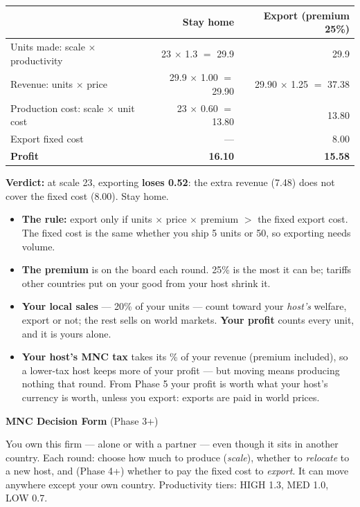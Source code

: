 \documentclass[11pt]{article}
\begin{document}
\vspace{6pt}
\begin{center}
\renewcommand{\arraystretch}{1.25}
\begin{tabular}{lrr}
\toprule
 & \textbf{Stay home} & \textbf{Export} (premium 25\%) \\
\midrule
Units made: scale $\times$ productivity & 23 $\times$ 1.3 $=$ 29.9 & 29.9 \\
Revenue: units $\times$ price & 29.9 $\times$ 1.00 $=$ 29.90
  & 29.90 $\times$ 1.25 $=$ 37.38 \\
Production cost: scale $\times$ unit cost & 23 $\times$ 0.60 $=$ 13.80 & 13.80 \\
Export fixed cost & --- & 8.00 \\
\midrule
\textbf{Profit} & \textbf{16.10} & \textbf{15.58} \\
\bottomrule
\end{tabular}
\end{center}

\textbf{Verdict:} at scale 23, exporting \textbf{loses 0.52}: the extra revenue (7.48) does not cover the fixed cost (8.00). Stay home.

\vspace{4pt}
\begin{itemize}[nosep,leftmargin=1.2em]
  \item \textbf{The rule:} export only if units $\times$ price $\times$ premium
    $>$ the fixed export cost. The fixed cost is the same whether you ship 5 units
    or 50, so exporting needs volume.
  \item \textbf{The premium} is on the board each round. 25\% is the most it
    can be; tariffs other countries put on your good from your host shrink it.
  \item \textbf{Your local sales} --- 20\% of your units --- count toward your
    \emph{host's} welfare, export or not; the rest sells on world markets.
    \textbf{Your profit} counts every unit, and it is yours alone.
  \item \textbf{Your host's MNC tax} takes its \% of your revenue (premium
    included), so a lower-tax host keeps more of your profit --- but moving
    means producing nothing that round. From Phase 5 your profit is worth what
    your host's currency is worth, unless you export: exports are paid in world
    prices.
\end{itemize}

\newpage
{\large\bfseries MNC Decision Form} \hfill (Phase 3+)\par
You own this firm --- alone or with a partner --- even though it sits in another country. Each round: choose how much to produce (\emph{scale}), whether to \emph{relocate} to a new host, and (Phase 4+) whether to pay the fixed cost to \emph{export}. It can move anywhere except your own country. Productivity tiers: HIGH 1.3, MED 1.0, LOW 0.7.
\vspace{6pt}
\end{document}
